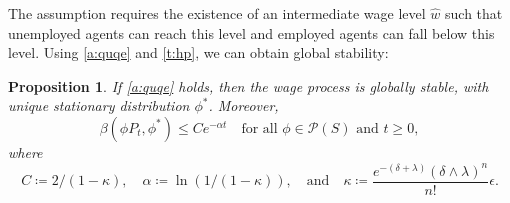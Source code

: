 \documentclass[12pt,reqno]{amsart}
\numberwithin{equation}{section}
\newtheorem{proposition}{Proposition}[section]
\theoremstyle{definition}
\newcommand{\1}{\mathbbm{1}}
\newcommand{\pP}{\mathscr{P}}
\begin{document}
The assumption requires the existence of an
intermediate wage level $\hat{w}$ such that unemployed agents can reach this
level and employed agents can fall below this level.
Using \cref{a:quqe} and \cref{t:hp}, we can obtain global stability:

\begin{proposition}\label{p:wagestable}
    If \cref{a:quqe} holds, then the wage process is globally stable, with
    unique stationary distribution $\phi^*$.  Moreover,
    \begin{equation}\label{eq:wage_exp}
        \beta(\phi P_t, \phi^*) \leq C e^{-\alpha t}
        \quad \text{for all } \phi \in \pP(S) \text{ and } t \geq 0,
    \end{equation}
    where 
    \begin{equation}\label{eq:kappa_def}
        C \coloneq 2/(1-\kappa), 
        \quad
        \alpha \coloneq \ln(1/(1-\kappa)),
        \quad \text{and} \quad
        \kappa \coloneq \frac{e^{-(\delta + \lambda)} (\delta \wedge \lambda)^n}{n!} \epsilon.
    \end{equation}
\end{proposition}
\end{document}

